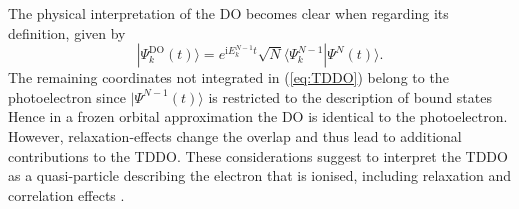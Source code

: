 {The physical interpretation of the DO becomes clear when regarding its definition, given by
\begin{equation} \label{eq:TDDO}
|\Psi_k^\text{DO}(t)\rangle =  e^{\text{i}E_k^{N-1}t}\sqrt{N} \langle \Psi_k^{N-1} |\Psi^N(t) \rangle.
\end{equation}
The remaining coordinates not integrated in (\ref{eq:TDDO}) belong to the photoelectron since $|\Psi^{N-1}(t)\rangle$ is restricted to the description of bound states
Hence in a frozen orbital approximation the DO is identical to the photoelectron.
However, relaxation-effects change the overlap and thus lead to additional contributions to the TDDO.
These considerations suggest to interpret the TDDO as a quasi-particle describing the electron that is ionised, including relaxation and correlation effects \cite{ezDyson,TD-do}.

}
